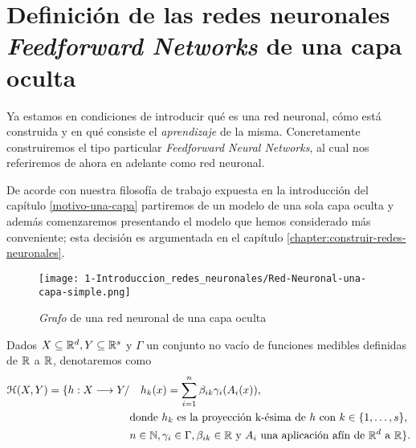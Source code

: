\section{Definición de las redes neuronales \textit{Feedforward Networks} 
de una capa oculta} \label{sec:redes-neuronales-intro-una-capa}

Ya estamos en condiciones de introducir qué es una red neuronal,
cómo está construida y en qué consiste el \textit{aprendizaje} de la misma. 
Concretamente
construiremos el tipo particular \textit{Feedforward Neural Networks}, al cual nos referiremos de ahora
en adelante como red neuronal.

De acorde con nuestra filosofía de trabajo expuesta en la introducción del capítulo \ref{motivo-una-capa}
partiremos de un modelo de una sola capa oculta y además comenzaremos presentando el modelo que 
hemos considerado más conveniente; esta decisión es argumentada en el capítulo \ref{chapter:construir-redes-neuronales}. 

\begin{figure}[h!]
    \centering
    \texttt{[image: 1-Introduccion\_redes\_neuronales/Red-Neuronal-una-capa-simple.png]}
    \caption{\textit{Grafo} de una red neuronal de una capa oculta}
    \label{img:grafo-red-neuronal-una-capa-oculta}
\end{figure}

    \begin{aportacionOriginal}
    \begin{definicion} \label{definition:redes_neuronales_una_capa_oculta}
        Dados $X \subseteq \mathbb{R}^d, Y \subseteq \mathbb{R}^s$ y  $\Gamma$ un conjunto no vacío de funciones medibles definidas de $\mathbb{R}$ a $\mathbb{R}$, denotaremos como 
        \begin{align}
            \mathcal{H}(X,Y) 
            =
            \{
                h : X \longrightarrow Y 
                /& \quad 
                h_k(x) = 
                \sum_{i=1}^{n} \beta_{i k} \gamma_{i}( A_{i}(x)), \\
                & \text{donde  $h_k$  es la proyección k-ésima de $h$ con 
                $k \in \{1, \ldots, s\}$}, \\
                & n \in \mathbb{N},\gamma_{i} \in \Gamma , \beta_{i k} \in \mathbb{R}
                \text{ y }A_{i} \text{ una aplicación afín de $\mathbb{R}^d$ a $\mathbb{R}$}           
            \}.
        \end{align}
    \end{definicion}
\end{aportacionOriginal}

